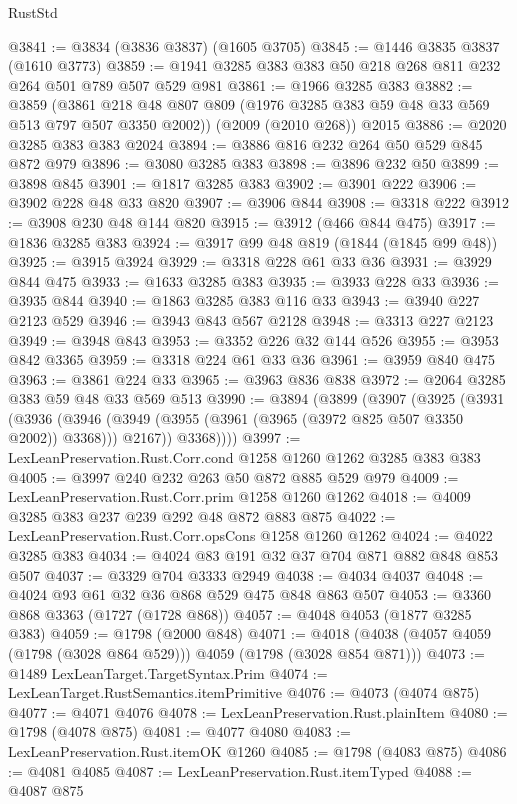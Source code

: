 \begin{lexlean}{RustStd}
\begin{coremodule}
{\begin{coremodule}
{{{{{{{{{{{{@3841 := @3834 (@3836 @3837) (@1605 @3705)
@3845 := @1446 @3835 @3837 (@1610 @3773)
@3859 := @1941 @3285 @383 @383 @50 @218 @268 @811 @232 @264 @501 @789 @507 @529 @981
@3861 := @1966 @3285 @383
@3882 := @3859
    (@3861 @218 @48 @807 @809 (@1976 @3285 @383 @59 @48 @33 @569 @513 @797 @507 @3350 @2002))
    (@2009 (@2010 @268))
    @2015
@3886 := @2020 @3285 @383 @383 @2024
@3894 := @3886 @816 @232 @264 @50 @529 @845 @872 @979
@3896 := @3080 @3285 @383
@3898 := @3896 @232 @50
@3899 := @3898 @845
@3901 := @1817 @3285 @383
@3902 := @3901 @222
@3906 := @3902 @228 @48 @33 @820
@3907 := @3906 @844
@3908 := @3318 @222
@3912 := @3908 @230 @48 @144 @820
@3915 := @3912 (@466 @844 @475)
@3917 := @1836 @3285 @383
@3924 := @3917 @99 @48 @819 (@1844 (@1845 @99 @48))
@3925 := @3915 @3924
@3929 := @3318 @228 @61 @33 @36
@3931 := @3929 @844 @475
@3933 := @1633 @3285 @383
@3935 := @3933 @228 @33
@3936 := @3935 @844
@3940 := @1863 @3285 @383 @116 @33
@3943 := @3940 @227 @2123 @529
@3946 := @3943 @843 @567 @2128
@3948 := @3313 @227 @2123
@3949 := @3948 @843
@3953 := @3352 @226 @32 @144 @526
@3955 := @3953 @842 @3365
@3959 := @3318 @224 @61 @33 @36
@3961 := @3959 @840 @475
@3963 := @3861 @224 @33
@3965 := @3963 @836 @838
@3972 := @2064 @3285 @383 @59 @48 @33 @569 @513
@3990 := @3894
    (@3899
      (@3907
        (@3925
          (@3931
            (@3936
              (@3946 (@3949 (@3955 (@3961 (@3965 (@3972 @825 @507 @3350 @2002)) @3368))) @2167))
            @3368))))
@3997 := LexLeanPreservation.Rust.Corr.cond @1258 @1260 @1262 @3285 @383 @383
@4005 := @3997 @240 @232 @263 @50 @872 @885 @529 @979
@4009 := LexLeanPreservation.Rust.Corr.prim @1258 @1260 @1262
@4018 := @4009 @3285 @383 @237 @239 @292 @48 @872 @883 @875
@4022 := LexLeanPreservation.Rust.Corr.opsCons @1258 @1260 @1262
@4024 := @4022 @3285 @383
@4034 := @4024 @83 @191 @32 @37 @704 @871 @882 @848 @853 @507
@4037 := @3329 @704 @3333 @2949
@4038 := @4034 @4037
@4048 := @4024 @93 @61 @32 @36 @868 @529 @475 @848 @863 @507
@4053 := @3360 @868 @3363 (@1727 (@1728 @868))
@4057 := @4048 @4053 (@1877 @3285 @383)
@4059 := @1798 (@2000 @848)
@4071 := @4018 (@4038 (@4057 @4059 (@1798 (@3028 @864 @529))) @4059 (@1798 (@3028 @854 @871)))
@4073 := @1489 LexLeanTarget.TargetSyntax.Prim
@4074 := LexLeanTarget.RustSemantics.itemPrimitive
@4076 := @4073 (@4074 @875)
@4077 := @4071 @4076
@4078 := LexLeanPreservation.Rust.plainItem
@4080 := @1798 (@4078 @875)
@4081 := @4077 @4080
@4083 := LexLeanPreservation.Rust.itemOK @1260
@4085 := @1798 (@4083 @875)
@4086 := @4081 @4085
@4087 := LexLeanPreservation.Rust.itemTyped
@4088 := @4087 @875
}}}}}}}}}}}}
\end{coremodule}}
\end{coremodule}
\end{lexlean}
